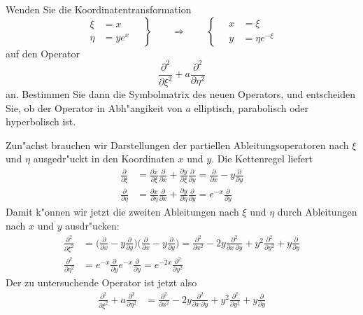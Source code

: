 Wenden Sie die Koordinatentransformation
\[
\left.
\begin{aligned}
\xi  &= x    \\
\eta &= ye^x 
\end{aligned}
\quad
\right\}
\qquad\Rightarrow\qquad
\left\{
\quad
\begin{aligned}
 x &= \xi\\
 y &= \eta e^{-\xi}
\end{aligned}
\right.
\]
auf den Operator
\[
\frac{\partial^2}{\partial \xi^2}+a\frac{\partial^2}{\partial \eta^2}
\]
an.
Bestimmen Sie dann die Symbolmatrix des neuen Operators, und entscheiden
Sie, ob der Operator in Abh"angikeit von $a$ elliptisch, parabolisch oder
hyperbolisch ist.

\begin{loesung}
Zun"achst brauchen wir Darstellungen der partiellen Ableitungsoperatoren
nach $\xi$ und $\eta$ ausgedr"uckt in den Koordinaten $x$ und $y$.
Die Kettenregel liefert
\begin{align*}
\frac{\partial}{\partial \xi}
&=
\frac{\partial x}{\partial \xi}\frac{\partial}{\partial x}
+
\frac{\partial y}{\partial \xi}\frac{\partial}{\partial y}
=
\frac{\partial}{\partial x}
-
y\frac{\partial}{\partial y}
\\
\frac{\partial}{\partial \eta}
&=
\frac{\partial x}{\partial \eta}\frac{\partial}{\partial x}
+
\frac{\partial y}{\partial \eta}\frac{\partial}{\partial y}
=
e^{-x} \frac{\partial}{\partial y}
\end{align*}
Damit k"onnen wir jetzt die zweiten Ableitungen nach $\xi$ und $\eta$ 
durch Ableitungen nach $x$ und $y$ ausdr"ucken:
\begin{align*}
\frac{\partial^2}{\partial\xi^2}
&=
\biggl(\frac{\partial}{\partial x}-y\frac{\partial}{\partial y}\biggr)
\biggl(\frac{\partial}{\partial x}-y\frac{\partial}{\partial y}\biggr)
=
\frac{\partial^2}{\partial x^2} - 2y\frac{\partial^2}{\partial x\,\partial y}
+y^2\frac{\partial^2}{\partial y^2}+y\frac{\partial}{\partial y}
\\
\frac{\partial^2}{\partial\eta^2}
&=
e^{-x}\frac{\partial}{\partial y}e^{-x}\frac{\partial}{\partial y}
=
e^{-2x}\frac{\partial^2}{\partial y^2}
\end{align*}
Der zu untersuchende Operator ist jetzt also
\begin{align*}
\frac{\partial^2}{\partial\xi^2}
+a
\frac{\partial^2}{\partial\eta^2}
&=
\frac{\partial^2}{\partial x^2} - 2y\frac{\partial^2}{\partial x\,\partial y}
+y^2\frac{\partial^2}{\partial y^2}+y\frac{\partial}{\partial y}

\end{align*}
\end{loesung}
